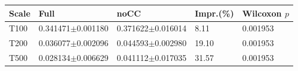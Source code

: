 \begin{tabular}{lllll}
\hline
Scale & Full & noCC & Impr.(\%) & Wilcoxon $p$ \\
\hline
T100 & 0.341471$\pm$0.001180 & 0.371622$\pm$0.016014 & 8.11 & 0.001953 \\
T200 & 0.036077$\pm$0.002096 & 0.044593$\pm$0.002980 & 19.10 & 0.001953 \\
T500 & 0.028134$\pm$0.006629 & 0.041112$\pm$0.017035 & 31.57 & 0.001953 \\
\hline
\end{tabular}